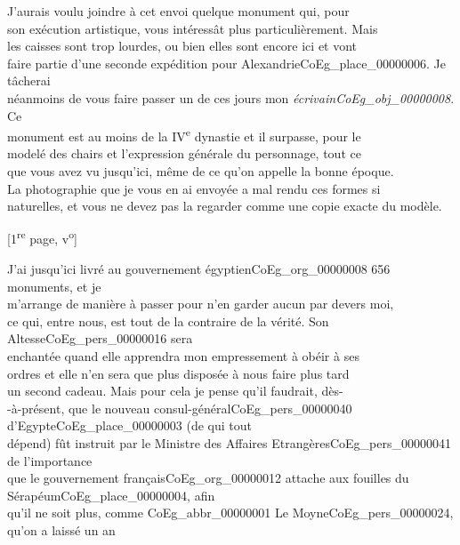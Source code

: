 \documentclass{book}
\begin{document}
\indent J’aurais voulu joindre à cet envoi quelque monument qui, pour\\
son exécution artistique, vous intéressât plus particulièrement. Mais\\
les caisses sont trop lourdes, ou bien elles sont encore ici et vont\\
faire partie d’une seconde expédition pour Alexandrie\gls{CoEg_place_00000006}. Je tâcherai\\
néanmoins de vous faire passer un de ces jours mon \textit{écrivain\gls{CoEg_obj_00000008}}. Ce\\
monument est au moins de la IV\textsuperscript{e} dynastie et il surpasse, pour le\\
modelé des chairs et l’expression générale du personnage, tout ce\\
que vous avez vu jusqu’ici, même de ce qu’on appelle la bonne époque.\\
La photographie que je vous en ai envoyée a mal rendu ces formes si\\
naturelles, et vous ne devez pas la regarder comme une copie exacte du modèle.
{\footnotesize \begin{center} {[1\textsuperscript{re} page, v\textsuperscript{o}]}\end{center}}
\indent J’ai jusqu’ici livré au gouvernement égyptien\gls{CoEg_org_00000008} 656 monuments, et je\\
m’arrange de manière à passer pour n’en garder aucun par devers moi,\\
ce qui, entre nous, est tout de la contraire de la vérité. Son Altesse\gls{CoEg_pers_00000016} sera\\
enchantée quand elle apprendra mon empressement à obéir à ses\\
ordres et elle n’en sera que plus disposée à nous faire plus tard\\
un second cadeau. Mais pour cela je pense qu’il faudrait, dès-\\
-à-présent, que le nouveau consul-général\gls{CoEg_pers_00000040} d’Egypte\gls{CoEg_place_00000003} (de qui tout\\
dépend) fût instruit par le Ministre des Affaires Etrangères\gls{CoEg_pers_00000041} de l’importance\\
que le gouvernement français\gls{CoEg_org_00000012} attache aux fouilles du Sérapéum\gls{CoEg_place_00000004}, afin\\
qu’il ne soit plus, comme \gls{CoEg_abbr_00000001} Le Moyne\gls{CoEg_pers_00000024}, qu’on a laissé un an\\
\end{document}
